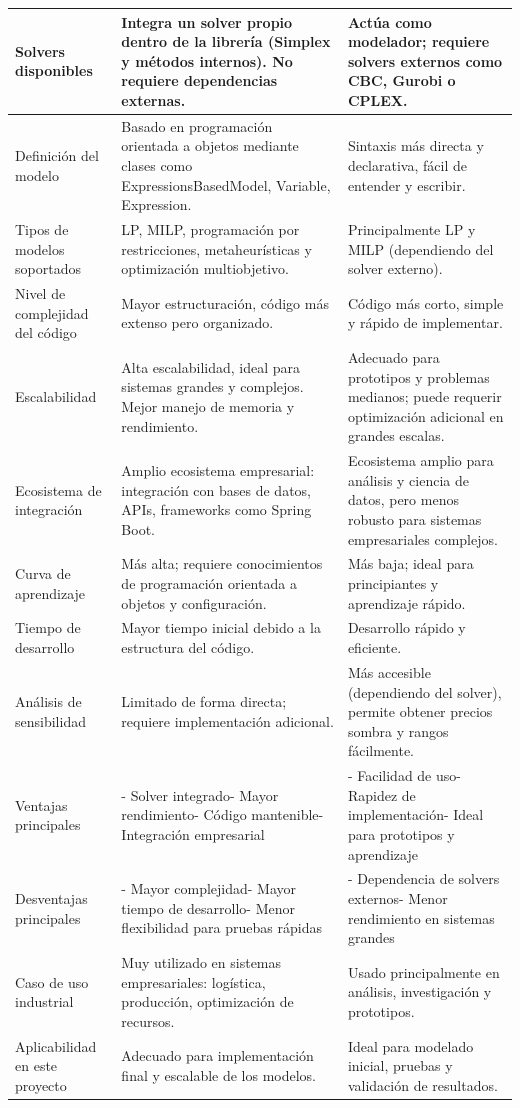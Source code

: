 \documentclass[12pt,letterpaper]{article}
\begin{document}
\begin{longtable}{|>{\raggedright\arraybackslash}p{}|>{\raggedright\arraybackslash}p{}|>{\raggedright\arraybackslash}p{}|}
	Solvers disponibles & Integra un solver propio dentro de la librería (Simplex y métodos internos). No requiere dependencias externas. & Actúa como modelador; requiere solvers externos como CBC, Gurobi o CPLEX. \\
		\hline
		Definición del modelo & Basado en programación orientada a objetos mediante clases como ExpressionsBasedModel, Variable, Expression. & Sintaxis más directa y declarativa, fácil de entender y escribir. \\
		\hline
		Tipos de modelos soportados & LP, MILP, programación por restricciones, metaheurísticas y optimización multiobjetivo. & Principalmente LP y MILP (dependiendo del solver externo). \\
		\hline
		Nivel de complejidad del código & Mayor estructuración, código más extenso pero organizado. & Código más corto, simple y rápido de implementar. \\
		\hline
		Escalabilidad & Alta escalabilidad, ideal para sistemas grandes y complejos. Mejor manejo de memoria y rendimiento. & Adecuado para prototipos y problemas medianos; puede requerir optimización adicional en grandes escalas. \\
		\hline
		Ecosistema de integración & Amplio ecosistema empresarial: integración con bases de datos, APIs, frameworks como Spring Boot. & Ecosistema amplio para análisis y ciencia de datos, pero menos robusto para sistemas empresariales complejos. \\
		\hline
		Curva de aprendizaje & Más alta; requiere conocimientos de programación orientada a objetos y configuración. & Más baja; ideal para principiantes y aprendizaje rápido. \\
		\hline
		Tiempo de desarrollo & Mayor tiempo inicial debido a la estructura del código. & Desarrollo rápido y eficiente. \\
		\hline
		Análisis de sensibilidad & Limitado de forma directa; requiere implementación adicional. & Más accesible (dependiendo del solver), permite obtener precios sombra y rangos fácilmente. \\
		\hline
		Ventajas principales & - Solver integrado- Mayor rendimiento- Código mantenible- Integración empresarial & - Facilidad de uso- Rapidez de implementación- Ideal para prototipos y aprendizaje \\
		\hline
		Desventajas principales & - Mayor complejidad- Mayor tiempo de desarrollo- Menor flexibilidad para pruebas rápidas & - Dependencia de solvers externos- Menor rendimiento en sistemas grandes \\
		\hline
		Caso de uso industrial & Muy utilizado en sistemas empresariales: logística, producción, optimización de recursos. & Usado principalmente en análisis, investigación y prototipos. \\
		\hline
		Aplicabilidad en este proyecto & Adecuado para implementación final y escalable de los modelos. & Ideal para modelado inicial, pruebas y validación de resultados. \\
		\hline
	\end{longtable}
\normalsize
\end{document}
